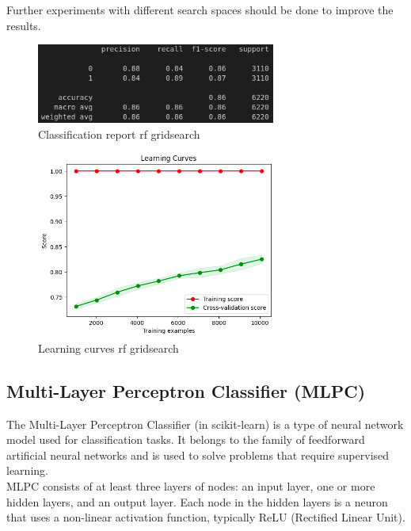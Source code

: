 \documentclass[a4paper,12pt]{article}
\begin{document}
Further experiments with different search spaces should be done to improve the results.

\begin{figure}[H]
  \centering
  \includegraphics[width=0.7\textwidth]{./images/report_rf_gridsearch.png}
  \caption{Classification report rf gridsearch}
  \label{fig:report_rf_gridsearch}
\end{figure}

\begin{figure}[H]
  \centering
  \includegraphics[width=0.7\textwidth]{./images/lc_rf_gridsearch.png}
  \caption{Learning curves rf gridsearch}
  \label{fig:lc_rf_gridsearch}
\end{figure}



\subsection{Multi-Layer Perceptron Classifier (MLPC)}


The Multi-Layer Perceptron Classifier (in scikit-learn) is a type of neural network model used for classification tasks. It belongs to the family of feedforward artificial neural networks and is used to solve problems that require supervised learning.\\

MLPC consists of at least three layers of nodes: an input layer, one or more hidden layers, and an output layer. Each node in the hidden layers is a neuron that uses a non-linear activation function, typically ReLU (Rectified Linear Unit).
\end{document}
